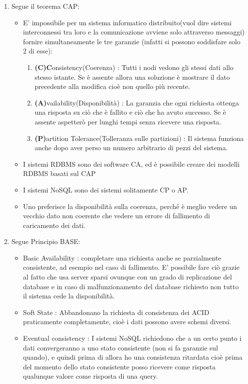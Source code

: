 \documentclass[a4page, 11pt]{article}
\begin{document}
\begin{enumerate}[noitemsep]
	\item
	Segue il teorema CAP:
	\begin{itemize}
		\item E' impossibile per un sistema informatico distribuito(vuol dire sistemi interconnessi tra loro e la comunicazione avviene solo attraverso messaggi) fornire simultaneamente le tre garanzie (infatti si possono soddisfare solo 2 di esse):
		\begin{enumerate}		
			\item
			\textbf{(C)C}onsistency(Coerenza) : Tutti i nodi vedono gli stessi dati allo stesso istante. Se è assente allora una soluzione è mostrare il dato precedente alla modifica cioè non quello più recente.
			\item
			\textbf{(A)}vailability(Disponibilità) : La garanzia che ogni richiesta ottenga una risposta su ciò che è fallito e ciò che ha avuto successo. Se è assente aspetterò per lunghi tempi senza ricevere una risposta.
			\item
			\textbf{(P)}artition Tolerance(Tolleranza sulle partizioni) : Il sistema funziona anche dopo aver perso un numero arbitrario di pezzi del sistema.
		\end{enumerate}
		\item
		I sistemi RDBMS sono dei software CA, ed è possibile creare dei modelli RDBMS basati sul CAP
		\item
		I sistemi NoSQL sono dei sistemi solitamente CP o AP.
		\item
		Uno preferisce la disponibilità sulla coerenza, perché è meglio vedere un vecchio dato non coerente che vedere un errore di fallimento di caricamento dei dati.
	\end{itemize}

	\item
	Segue Principio BASE:
	\begin{itemize}
		
		\item
		Basic Availability : completare una richiesta anche se parzialmente consistente, ad esempio nel caso di fallimento. E' possibile fare ciò grazie al fatto che usa server sparsi ovunque con un grado di	replicazione del database e in caso di malfunzionamento del database richiesto non tutto il sistema cede la disponibilità.
		\item
		Soft State : Abbandonano la richiesta di consistenza dei ACID praticamente completamente, cioè i dati possono avere schemi diversi.
		\item
		Eventual consistency : I sistemi NoSQL richiedono che a un certo punto i dati convergeranno a uno stato consistente (non si fa garanzie sul quando), e quindi prima di allora ho una consistenza ritardata cioè prima del momento dello stato consistente posso ricevere come risposta qualunque valore come risposta di una query.
	\end{itemize}
\end{enumerate}
\end{document}
